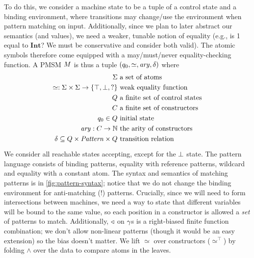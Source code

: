 \documentclass[preprint,onecolumn,9pt]{sigplanconf} %
\begin{document}
To do this, we consider a machine state to be a tuple of a control state and a binding environment, where transitions may change/use the environment when pattern matching on input.
%
Additionally, since we plan to later abstract our semantics (and values), we need a weaker, tunable notion of equality (e.g., is 1 equal to $\mathbf{Int}$? We must be conservative and consider both valid).
%
The atomic symbols therefore come equipped with a may/must/never equality-checking function.
%
A PMSM $M$ is thus a tuple $(q_0, \simeq, \mathit{ary}, \delta)$ where
\begin{align*}
  \Sigma &\text{ a set of atoms} \\
  \simeq : \Sigma \times \Sigma \to \{\top, \bot, ?\} &\text{ weak equality function}\\
  Q &\text{ a finite set of control states} \\
  C &\text{ a finite set of constructors} \\
  q_0 \in Q &\text{ initial state} \\
  \mathit{ary} : C \to {\mathbb N}&\text{ the arity of constructors} \\
  \delta \subseteq Q \times \mathit{Pattern} \times Q & \text{ transition relation}\\[2pt]
\end{align*}
%
We consider all reachable states accepting, except for the $\bot$ state.
%
The pattern language consists of binding patterns, equality with reference patterns, wildcard and equality with a constant atom.
%
The syntax and semantics of matching patterns is in \autoref{fig:pattern-syntax}; notice that we do not change the binding environment for anti-matching ($!$) patterns.
%
Crucially, since we will need to form intersections between machines, we need a way to state that different variables will be bound to the same value, so each position in a constructor is allowed a \emph{set} of patterns to match.
%
Additionally, $\triangleleft$ on $\gamma$s is a right-biased finite function combination; we don't allow non-linear patterns (though it would be an easy extension) so the bias doesn't matter.
%
We lift $\simeq$ over constructors ($\simeq^\top$) by folding $\wedge$ over the data to compare atoms in the leaves.
%
\end{document}
